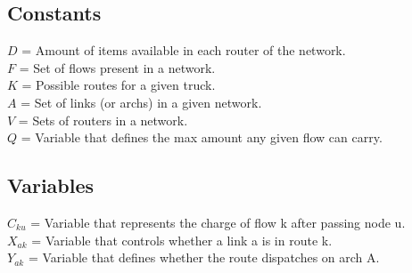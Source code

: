 \subsection{Constants}
$D$ = Amount of items available in each router of the network. \\
$F$ = Set of flows present in a network. \\
$K$ = Possible routes for a given truck. \\
$A$ = Set of links (or archs) in a given network. \\
$V$ = Sets of routers in a network. \\
$Q$ = Variable that defines the max amount any given flow can carry.

\subsection{Variables}
$C_{ku}$ =  Variable that represents the charge of flow k after passing node u. \\
$X_{ak}$ =  Variable that controls whether a link a is in route k. \\ 
$Y_{ak}$ =  Variable that defines whether the route dispatches on arch A. \\

